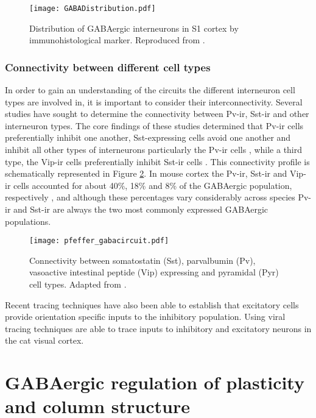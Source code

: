 \begin{figure}
	\centering
        \texttt{[image: GABADistribution.pdf]}
	\caption{Distribution of GABAergic interneurons in S1
        cortex by immunohistological marker. Reproduced from
        \cite{Rudy2011}.}
	\label{GABADistribution}
\end{figure}


\subsubsection{Connectivity between different cell types}

In order to gain an understanding of the circuits the different
interneuron cell types are involved in, it is important to consider
their interconnectivity. Several studies have sought to determine the
connectivity between Pv-ir, Sst-ir and other interneuron types. The
core findings of these studies determined that Pv-ir cells
preferentially inhibit one another, Sst-expressing cells avoid one
another and inhibit all other types of interneurons particularly the
Pv-ir cells \citep{Xu2013}, while a third type, the Vip-ir cells
preferentially inhibit Sst-ir cells \citep{Pfeffer2013}. This
connectivity profile is schematically represented in Figure
\ref{gaba_circuit}. In mouse cortex the Pv-ir, Sst-ir and Vip-ir cells
accounted for about 40\%, 18\% and 8\% of the GABAergic population,
respectively \citep{Xu2010}, and although these percentages vary
considerably across species Pv-ir and Sst-ir are always the two most
commonly expressed GABAergic populations.

\begin{figure}
	\centering
        \texttt{[image: pfeffer\_gabacircuit.pdf]}
	\caption{Connectivity between somatostatin (Sst),
        parvalbumin (Pv), vasoactive intestinal peptide (Vip)
        expressing and pyramidal (Pyr) cell types. Adapted from
        \cite{Pfeffer2013}.}
	\label{gaba_circuit}
\end{figure}

Recent tracing techniques have also been able to establish that
excitatory cells provide orientation specific inputs to the inhibitory
population. Using viral tracing techniques \cite{Liu2013} are able to
trace inputs to inhibitory and excitatory neurons in the cat visual
cortex.

\section{GABAergic regulation of plasticity and column structure}

